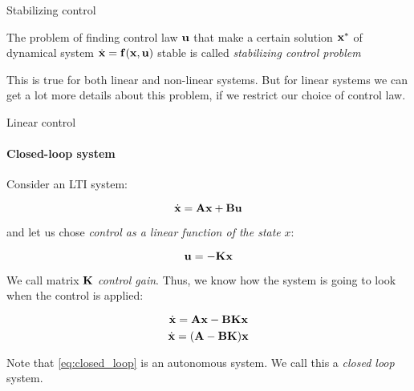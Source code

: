 \documentclass{beamer}
\begin{document}
\begin{frame}{Stabilizing control}
\begin{flushleft}

\begin{definition}
The problem of finding control law $\mathbf{u}$ that make a certain solution $\mathbf{x}^*$ of dynamical system $\dot{\mathbf{x}} = \mathbf{f}(\mathbf{x}, \mathbf{u})$ stable is called \emph{stabilizing control problem}
\end{definition}

\bigskip

This is true for both linear and non-linear systems. But for linear systems we can get a lot more details about this problem, if we restrict our choice of control law.



\end{flushleft}
\end{frame}



\begin{frame}{Linear control}
\framesubtitle{Closed-loop system}
\begin{flushleft}

Consider an LTI system:

\begin{equation}
    \dot{\mathbf{x}} = \mathbf{A}\mathbf{x} + \mathbf{B}\mathbf{u}
\end{equation}

and let us chose \emph{control as a linear function of the state} $x$:

\begin{equation}
    \mathbf{u} = -\mathbf{K}\mathbf{x}
\end{equation}

We call matrix $\mathbf{K}$ \emph{control gain}. Thus, we know how the system is going to look when the control is applied:

\begin{equation}
    \dot{\mathbf{x}} = \mathbf{A}\mathbf{x} - \mathbf{B}\mathbf{K}\mathbf{x}
\end{equation}
\begin{equation}
\label{eq:closed_loop}
    \dot{\mathbf{x}} = (\mathbf{A} - \mathbf{B}\mathbf{K})\mathbf{x}
\end{equation}

Note that \eqref{eq:closed_loop} is an autonomous system. We call this a \emph{closed loop} system.

\end{flushleft}
\end{frame}
\end{document}
